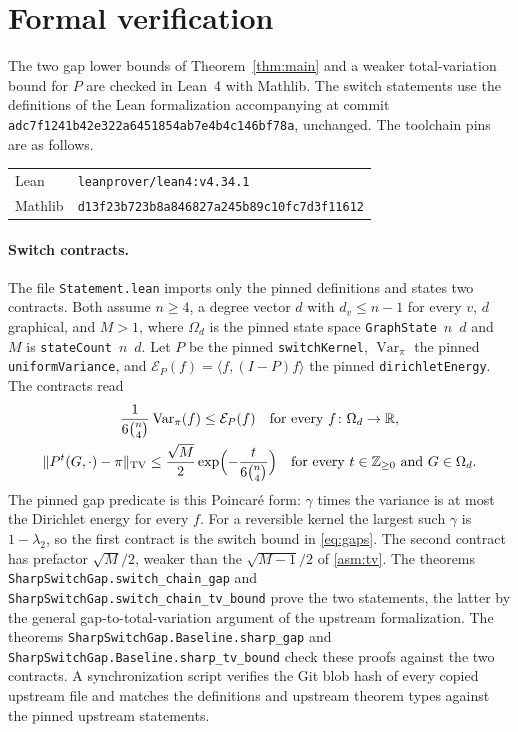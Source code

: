 \section{Formal verification}\label{fv:section}
The two gap lower bounds of Theorem~\ref{thm:main} and a weaker
total-variation bound for $P$ are checked in Lean~4 with Mathlib. The switch
statements use the definitions of the Lean formalization accompanying
\cite{OAI26} at commit \texttt{adc7f1241b42e322a6451854ab7e4b4c146bf78a},
unchanged. The toolchain pins are as follows.
\begin{center}
\begin{tabular}{ll}
\toprule
Lean & \texttt{leanprover/lean4:v4.34.1}\\
Mathlib & \texttt{d13f23b723b8a846827a245b89c10fc7d3f11612}\\
\bottomrule
\end{tabular}
\end{center}

\paragraph{Switch contracts.}
The file \texttt{Statement.lean} imports only the pinned definitions and
states two contracts. Both assume $n\ge4$, a degree vector $d$ with
$d_v\le n-1$ for every $v$, $d$ graphical, and $M>1$, where $\Omega_d$ is the
pinned state space \texttt{GraphState}~$n$~$d$ and $M$ is
\texttt{stateCount}~$n$~$d$. Let $P$ be the pinned \texttt{switchKernel},
$\operatorname{Var}_\pi$ the pinned \texttt{uniformVariance}, and
$\mathcal E_P(f)=\langle f,(I-P)f\rangle$ the pinned \texttt{dirichletEnergy}.
The contracts read
\begin{gather*}
 \frac{1}{6\binom n4}\operatorname{Var}_\pi(f)\le\mathcal E_P(f)
 \quad\text{for every }f\colon\Omega_d\to\mathbb R,\\
 \|P^t(G,\cdot)-\pi\|_{\mathrm{TV}}
 \le\frac{\sqrt M}{2}\exp\Bigl(-\frac{t}{6\binom n4}\Bigr)
 \quad\text{for every }t\in\mathbb Z_{\ge0}\text{ and }G\in\Omega_d.
\end{gather*}
The pinned gap predicate is this Poincar\'e form: $\gamma$ times the
variance is at most the Dirichlet energy for every $f$. For a reversible
kernel the largest such $\gamma$ is $1-\lambda_2$, so the first contract is
the switch bound in \eqref{eq:gaps}. The second contract has prefactor
$\sqrt M/2$, weaker than the $\sqrt{M-1}/2$ of \eqref{asm:tv}. The theorems
\texttt{SharpSwitchGap.\allowbreak switch\_chain\_gap} and
\texttt{SharpSwitchGap.\allowbreak switch\_chain\_tv\_bound} prove the two
statements, the latter by the general gap-to-total-variation argument of the
upstream formalization. The theorems
\texttt{SharpSwitchGap.\allowbreak Baseline.\allowbreak sharp\_gap} and
\texttt{SharpSwitchGap.\allowbreak Baseline.\allowbreak sharp\_tv\_bound}
check these proofs against the two contracts. A synchronization script verifies the Git blob hash of
every copied upstream file and matches the definitions and upstream theorem
types against the pinned upstream statements.


